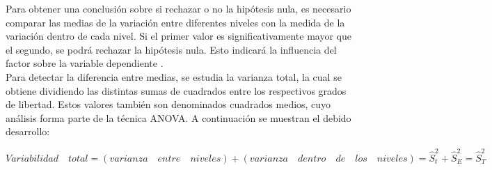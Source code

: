 Para obtener una conclusión sobre si rechazar o no la hipótesis nula, es necesario comparar las medias de la variación entre diferentes niveles con la medida de la variación dentro de cada nivel. Si el primer valor es significativamente mayor que el segundo, se podrá rechazar la hipótesis nula. Esto indicará la influencia del factor sobre la variable dependiente \cite{terradez2003analisis}.\\

Para detectar la diferencia entre medias, se estudia la varianza total, la cual se obtiene dividiendo las distintas sumas de cuadrados entre los respectivos grados de libertad. Estos valores también son denominados cuadrados medios, cuyo análisis forma parte de la técnica ANOVA. A continuación se muestran el debido desarrollo:
\begin{center}
$Variabilidad\quad total = (varianza\quad entre\quad niveles) + (varianza\quad dentro \quad de\quad los\quad niveles) = \hat{S}_{t}^{2} + \hat{S}_{E}^{2} = \hat{S}_{T}^{2}$
\end{center}

